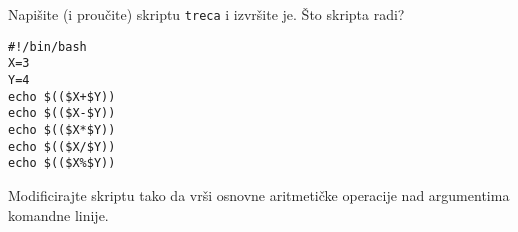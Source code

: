 \begin{zadatak}
 Napišite (i proučite) skriptu \texttt{treca} i izvršite je. Što skripta radi?
\begin{lstlisting}
#!/bin/bash
X=3
Y=4
echo $(($X+$Y))
echo $(($X-$Y))
echo $(($X*$Y))
echo $(($X/$Y))
echo $(($X%$Y))

\end{lstlisting}
\end{zadatak}

\begin{zadatak}
Modificirajte skriptu tako da vrši osnovne aritmetičke operacije nad argumentima komandne linije.
\end{zadatak}

\begin{comment}

\vfill
\begin{itemize}
\renewcommand{\labelitemi}{\textbf{$\rightarrow$}}
\item Popis svih pokrenutih naredbi zajedno sa zadnjim zadatkom eksportirajte u datoteku imena \texttt{prezime\_ime\_vj8.txt}. Uploadajte datoteku na \href{https://moodle.oss.unist.hr/course/view.php?id=133}{http://moodle.oss.unist.hr}.
\end{itemize}

\end{comment}
